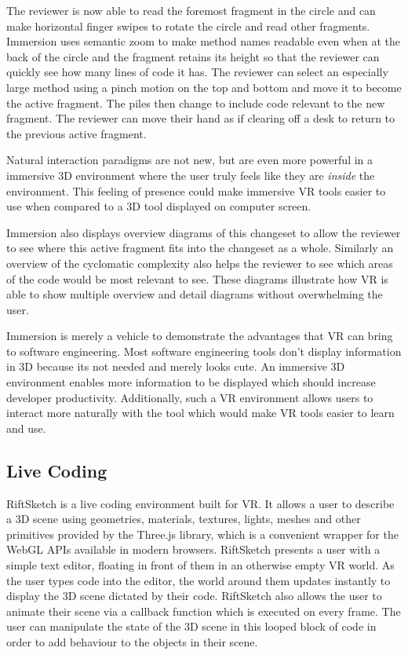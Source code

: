 \documentclass[conference]{IEEEtran}
\begin{document}
The reviewer is now able to read the foremost fragment in the circle and can make horizontal finger swipes to rotate the circle and read other fragments. 
Immersion uses semantic zoom to make method names readable even when at the back of the circle and the fragment retains its height so that the reviewer can quickly see how many lines of code it has. 
The reviewer can select an especially large method using a pinch motion on the top and bottom and move it to become the active fragment. 
The piles then change to include code relevant to the new fragment. 
The reviewer can move their hand as if clearing off a desk to return to the previous active fragment.

Natural interaction paradigms are not new, but are even more powerful in a immersive 3D environment where the user truly feels like they are \textit{inside} the environment. 
This feeling of presence could make immersive VR tools easier to use when compared to a 3D tool displayed on computer screen. 

Immersion also displays overview diagrams of this changeset to allow the reviewer to see where this active fragment fits into the changeset as a whole. 
Similarly an overview of the cyclomatic complexity also helps the reviewer to see which areas of the code would be most relevant to see. 
These diagrams illustrate how VR is able to show multiple overview and detail diagrams without overwhelming the user.

Immersion is merely a vehicle to demonstrate the advantages that VR can bring to software engineering. 
Most software engineering tools don't display information in 3D because its not needed and merely looks cute. 
An immersive 3D environment enables more information to be displayed which should increase developer productivity.
Additionally, such a VR environment allows users to interact more naturally with the tool which would make VR tools easier to learn and use.

\subsection{Live Coding}
RiftSketch is a live coding environment built for VR. 
It allows a user to describe a 3D scene using geometries, materials, textures, lights, meshes and other primitives provided by the Three.js library, which is a convenient wrapper for the WebGL APIs available in modern browsers. 
RiftSketch presents a user with a simple text editor, floating in front of them in an otherwise empty VR world. 
As the user types code into the editor, the world around them updates instantly to display the 3D scene dictated by their code. 
RiftSketch also allows the user to animate their scene via a callback function which is executed on every frame. 
The user can manipulate the state of the 3D scene in this looped block of code in order to add behaviour to the objects in their scene.
\end{document}

